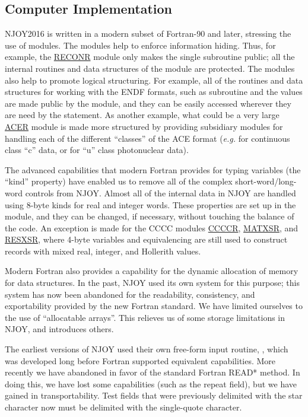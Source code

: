 \subsection{Computer Implementation}
\label{ssINTRO_implementation}

NJOY2016 is written in a modern subset of Fortran-90 and
later, stressing the
use of modules.  The modules
help to enforce information hiding.  Thus, for example, the
\hyperlink{sRECONRhy}{RECONR} module only
makes the single subroutine  public; all the internal
routines and data structures of the module are protected.  The
modules also help to promote logical structuring.  For example,
all of the routines and data structures for working with the ENDF
formats, such as subroutine  and the 
values are made public by the  module, and they can be
easily accessed wherever they are need by the 
statement.  As another example, what could be a very
large \hyperlink{sACERhy}{ACER}
module is made more structured by providing subsidiary modules for
handling each of the different ``classes'' of the ACE format ({\it e.g.}
 for continuous class ``c'' data, or 
for ``u'' class photonuclear data).

The advanced capabilities that modern Fortran provides for typing
variables (the ``kind'' property) have enabled us to remove
all of the complex short-word/long-word controls from NJOY.
Almost all of the internal data in NJOY are handled using
8-byte kinds for real and integer words.  These properties
are set up in the  module, and they can be changed,
if necessary, without touching the balance of the code.  An
exception is made for the CCCC modules
\hyperlink{sCCCCRhy}{CCCCR}, \hyperlink{sMATXSRhy}{MATXSR},
and \hyperlink{sRESXSRhy}{RESXSR},
where 4-byte variables and equivalencing are still used to
construct records with mixed real, integer, and Hollerith values.

Modern Fortran also provides a capability for the dynamic allocation
 of memory for data structures.
In the past, NJOY used its own
 system for this purpose;
this system has now been abandoned for the readability, consistency,
and exportability provided by the new Fortran standard.  We have
limited ourselves to the use of ``allocatable arrays''.  This
relieves us of some storage limitations in NJOY, and introduces others.

The earliest versions of NJOY used their own free-form input routine,
 , which was developed long
before Fortran supported equivalent capabilities.  More recently we
have abandoned  in favor of the standard Fortran READ*
method.  In doing this, we have lost some capabilities (such as the
repeat field), but we have gained in transportability.  Test
fields that were previously delimited with the star character now
must be delimited with the single-quote character.

